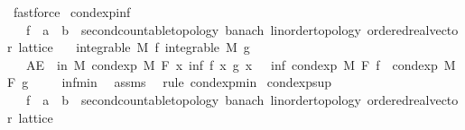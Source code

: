 \begin{isabellebody}
\ fastforce\isanewline
{}\isamarkupfalse%
%
\endisatagproof
{\isafoldproof}%
%
\isadelimproof
\isanewline
%
\endisadelimproof
\isanewline
{}\isamarkupfalse%
\ cond{\isacharunderscore}{\kern0pt}exp{\isacharunderscore}{\kern0pt}inf{\isacharcolon}{\kern0pt}\isanewline
\ \ \ f\ {\isacharcolon}{\kern0pt}{\isacharcolon}{\kern0pt}\ {\isachardoublequoteopen}{\isacharprime}{\kern0pt}a\ {\isasymRightarrow}\ {\isacharprime}{\kern0pt}b\ {\isacharcolon}{\kern0pt}{\isacharcolon}{\kern0pt}\ {\isacharbraceleft}{\kern0pt}second{\isacharunderscore}{\kern0pt}countable{\isacharunderscore}{\kern0pt}topology{\isacharcomma}{\kern0pt}\ banach{\isacharcomma}{\kern0pt}\ linorder{\isacharunderscore}{\kern0pt}topology{\isacharcomma}{\kern0pt}\ ordered{\isacharunderscore}{\kern0pt}real{\isacharunderscore}{\kern0pt}vector{\isacharcomma}{\kern0pt}\ lattice{\isacharbraceright}{\kern0pt}{\isachardoublequoteclose}\isanewline
\ \ \ {\isachardoublequoteopen}integrable\ M\ f{\isachardoublequoteclose}\ {\isachardoublequoteopen}integrable\ M\ g{\isachardoublequoteclose}\isanewline
\ \ \ {\isachardoublequoteopen}AE\ {\isasymxi}\ in\ M{\isachardot}{\kern0pt}\ cond{\isacharunderscore}{\kern0pt}exp\ M\ F\ {\isacharparenleft}{\kern0pt}{\isasymlambda}x{\isachardot}{\kern0pt}\ inf\ {\isacharparenleft}{\kern0pt}f\ x{\isacharparenright}{\kern0pt}\ {\isacharparenleft}{\kern0pt}g\ x{\isacharparenright}{\kern0pt}{\isacharparenright}{\kern0pt}\ {\isasymxi}\ {\isasymle}\ inf\ {\isacharparenleft}{\kern0pt}cond{\isacharunderscore}{\kern0pt}exp\ M\ F\ f\ {\isasymxi}{\isacharparenright}{\kern0pt}\ {\isacharparenleft}{\kern0pt}cond{\isacharunderscore}{\kern0pt}exp\ M\ F\ g\ {\isasymxi}{\isacharparenright}{\kern0pt}{\isachardoublequoteclose}\isanewline
%
\isadelimproof
\ \ %
\endisadelimproof
%
\isatagproof
{}\isamarkupfalse%
\ inf{\isacharunderscore}{\kern0pt}min\ \isamarkupfalse%
\ assms\ \isamarkupfalse%
\ {\isacharparenleft}{\kern0pt}rule\ cond{\isacharunderscore}{\kern0pt}exp{\isacharunderscore}{\kern0pt}min{\isacharparenright}{\kern0pt}%
\endisatagproof
{\isafoldproof}%
%
\isadelimproof
\isanewline
%
\endisadelimproof
\isanewline
{}\isamarkupfalse%
\ cond{\isacharunderscore}{\kern0pt}exp{\isacharunderscore}{\kern0pt}sup{\isacharcolon}{\kern0pt}\isanewline
\ \ \ f\ {\isacharcolon}{\kern0pt}{\isacharcolon}{\kern0pt}\ {\isachardoublequoteopen}{\isacharprime}{\kern0pt}a\ {\isasymRightarrow}\ {\isacharprime}{\kern0pt}b\ {\isacharcolon}{\kern0pt}{\isacharcolon}{\kern0pt}\ {\isacharbraceleft}{\kern0pt}second{\isacharunderscore}{\kern0pt}countable{\isacharunderscore}{\kern0pt}topology{\isacharcomma}{\kern0pt}\ banach{\isacharcomma}{\kern0pt}\ linorder{\isacharunderscore}{\kern0pt}topology{\isacharcomma}{\kern0pt}\ ordered{\isacharunderscore}{\kern0pt}real{\isacharunderscore}{\kern0pt}vector{\isacharcomma}{\kern0pt}\ lattice{\isacharbraceright}{\kern0pt}{\isachardoublequoteclose}\isanewline

\end{isabellebody}
